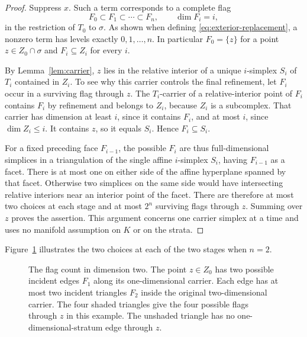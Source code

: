 \begin{proof}
Suppress $x$. Such a term corresponds to a complete flag
\[
 F_0\subset F_1\subset\cdots\subset F_n,
 \qquad \dim F_i=i,
\]
in the restriction of $T_0$ to $\sigma$. As shown when defining
\eqref{eq:exterior-replacement}, a nonzero term has levels exactly
$0,1,\ldots,n$. In particular $F_0=\{z\}$ for a point
$z\in Z_0\cap\sigma$ and $F_i\subseteq Z_i$ for every $i$.

By Lemma~\ref{lem:carrier}, $z$ lies in the relative interior of
a unique $i$-simplex $S_i$ of $T_i$ contained in $Z_i$. To see why
this carrier controls the final refinement, let $F_i$ occur in a
surviving flag through $z$. The $T_i$-carrier of a relative-interior
point of $F_i$ contains $F_i$ by refinement and belongs to $Z_i$,
because $Z_i$ is a subcomplex. That carrier has dimension at least
$i$, since it contains $F_i$, and at most $i$, since $\dim Z_i\leq i$.
It contains $z$, so it equals $S_i$. Hence $F_i\subseteq S_i$.

For a fixed preceding face $F_{i-1}$, the possible $F_i$ are thus
full-dimensional simplices in a triangulation of the single affine
$i$-simplex $S_i$, having $F_{i-1}$ as a facet. There is at most one
on either side of the affine hyperplane spanned by that facet.
Otherwise two simplices on the same side would have intersecting
relative interiors near an interior point of the facet. There
are therefore at most two choices at each stage and at most $2^n$
surviving flags through $z$. Summing over $z$ proves the assertion.
This argument concerns one carrier simplex at a time and uses no
manifold assumption on $K$ or on the strata.
\end{proof}

Figure~\ref{fig:flags} illustrates the two choices at each of the two
stages when $n=2$.

\begin{figure}[htbp]
\centering
{}
\caption{The flag count in dimension two. The point $z\in Z_0$ has
two possible incident edges $F_1$ along its one-dimensional carrier.
Each edge has at most two incident triangles $F_2$ inside the original
two-dimensional carrier. The four shaded triangles give the four possible
flags through $z$ in this example. The unshaded triangle has no
one-dimensional-stratum edge through $z$.}
\label{fig:flags}
\end{figure}

